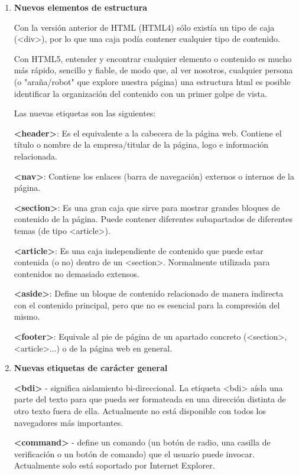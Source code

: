 \documentclass{apuntes}
\begin{document}
\begin{enumerate}
\item\textbf{Nuevos elementos de estructura}

Con la versión anterior de HTML (HTML4) sólo existía un tipo de caja (<div>), por lo que una caja podía contener cualquier tipo de contenido. 

Con HTML5, entender y encontrar cualquier elemento o contenido es mucho más rápido, sencillo y fiable, de modo que, al ver nosotros, cualquier persona (o "araña/robot" que explore nuestra página) una estructura html es posible identificar la organización del contenido con un primer golpe de vista. 

Las nuevas etiquetas son las siguientes:

\textbf{<header>}:
Es el equivalente a la cabecera de la página web. Contiene el título o nombre de la empresa/titular de la página, logo e información relacionada.

\textbf{<nav>}:
Contiene los enlaces (barra de navegación) externos o internos de la página.

\textbf{<section>}:
Es una gran caja que sirve para mostrar grandes bloques de contenido de la página. Puede contener diferentes subapartados de diferentes temas (de tipo <article>).

\textbf{<article>}:
Es una caja independiente de contenido que puede estar contenida (o no) dentro de un <section>. Normalmente utilizada para contenidos no demasiado extensos.

\textbf{<aside>}:
Define un bloque de contenido relacionado de manera indirecta con el contenido principal, pero que no es esencial para la compresión del mismo.

\textbf{<footer>}:
Equivale al pie de página de un apartado concreto (<section>, <article>...) o de la página web en general.



\item \textbf {Nuevas etiquetas de carácter general}

\textbf{<bdi>} - significa aislamiento bi-direccional. La etiqueta <bdi> aísla una parte del texto para que pueda ser formateada en una dirección distinta de otro texto fuera de ella. Actualmente no está disponible con todos los navegadores más importantes.

\textbf{<command>} - define un comando (un botón de radio, una casilla de verificación o un botón de comando) que el usuario puede invocar. Actualmente solo está soportado por Internet Explorer.


\end{enumerate}
\end{document}

